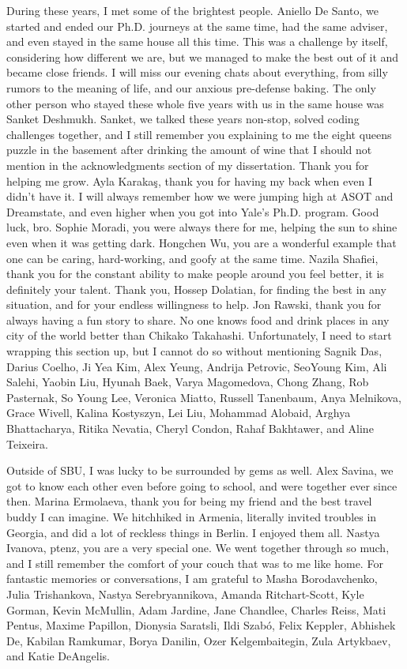 {During these years, I met some of the brightest people.
Aniello De Santo, we started and ended our Ph.D. journeys at the same time, had the same adviser, and even stayed in the same house all this time.
This was a challenge by itself, considering how different we are, but we managed to make the best out of it and became close friends.
I will miss our evening chats about everything, from silly rumors to the meaning of life, and our anxious pre-defense baking.
The only other person who stayed these whole five years with us in the same house was Sanket Deshmukh.
Sanket, we talked these years non-stop, solved coding challenges together, and I still remember you explaining to me the eight queens puzzle in the basement after drinking the amount of wine that I should not mention in the acknowledgments section of my dissertation.
Thank you for helping me grow.
Ayla Karaka\c{s}, thank you for having my back when even I didn't have it.
I will always remember how we were jumping high at ASOT and Dreamstate, and even higher when you got into Yale's Ph.D. program.
Good luck, bro.
Sophie Moradi, you were always there for me, helping the sun to shine even when it was getting dark.
Hongchen Wu, you are a wonderful example that one can be caring, hard-working, and goofy at the same time.
Nazila Shafiei, thank you for the constant ability to make people around you feel better, it is definitely your talent.
Thank you, Hossep Dolatian, for finding the best in any situation, and for your endless willingness to help.
Jon Rawski, thank you for always having a fun story to share.
No one knows food and drink places in any city of the world better than Chikako Takahashi.
Unfortunately, I need to start wrapping this section up, but I cannot do so without mentioning Sagnik Das, Darius Coelho, Ji Yea Kim, Alex Yeung, Andrija Petrovic, SeoYoung Kim, Ali Salehi, Yaobin Liu, Hyunah Baek, Varya Magomedova, Chong Zhang, Rob Pasternak, So Young Lee, Veronica Miatto, Russell Tanenbaum, Anya Melnikova, Grace Wivell, Kalina Kostyszyn, Lei Liu, Mohammad Alobaid, Arghya Bhattacharya, Ritika Nevatia, Cheryl Condon, Rahaf Bakhtawer, and Aline Teixeira.

Outside of SBU, I was lucky to be surrounded by gems as well.
Alex Savina, we got to know each other even before going to school, and were together ever since then.
Marina Ermolaeva, thank you for being my friend and the best travel buddy I can imagine.
We hitchhiked in Armenia, literally invited troubles in Georgia, and did a lot of reckless things in Berlin.
I enjoyed them all.
Nastya Ivanova, ptenz, you are a very special one.
We went together through so much, and I still remember the comfort of your couch that was to me like home.
For fantastic memories or conversations, I am grateful to Masha Borodavchenko, Julia Trishankova, Nastya Serebryannikova, Amanda Ritchart-Scott, Kyle Gorman, Kevin McMullin, Adam Jardine, Jane Chandlee, Charles Reiss, Mati Pentus, Maxime Papillon, Dionysia Saratsli, Ildi Szab\'o, Felix Keppler, Abhishek De, Kabilan Ramkumar, Borya Danilin, Ozer Kelgembaitegin, Zula Artykbaev, and Katie DeAngelis.

}
